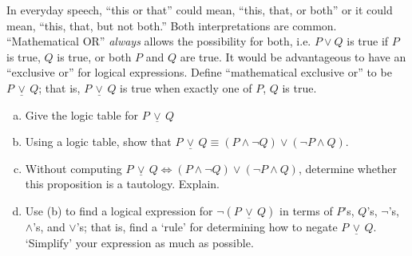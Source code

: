 \documentclass[11pt,letterpaper]{article}
\newcommand{\xor}{\,\underline{\vee}\,}
\begin{document}
\newpage



 In everyday speech, ``this or that'' could mean, ``this, that, or both'' or it could mean, ``this, that, but not both.'' Both interpretations are common. ``Mathematical OR'' \textit{always} allows the possibility for both, i.e. $P \vee Q$ is true if $P$ is true, $Q$ is true, or both $P$ and $Q$ are true. It would be advantageous to have an ``exclusive or'' for logical expressions. Define ``mathematical exclusive or'' to be $P \xor Q$; that is, $P \xor Q$ is true when exactly one of $P$, $Q$ is true. 
	\begin{enumerate}[(a)]
	\item Give the logic table for $P \xor Q$
	\item Using a logic table, show that $P \xor Q \equiv (P \wedge \neg Q) \vee (\neg P \wedge Q)$.
	\item Without computing $P \xor Q \iff (P \wedge \neg Q) \vee (\neg P \wedge Q)$, determine whether this proposition is a tautology. Explain. 
	\item Use (b) to find a logical expression for $\neg (P \xor Q)$ in terms of $P$'s, $Q$'s, $\neg$'s, $\wedge$'s, and $\vee$'s; that is, find a `rule' for determining how to negate $P \xor Q$. `Simplify' your expression as much as possible. 	
	\end{enumerate} \pspace
\end{document}
